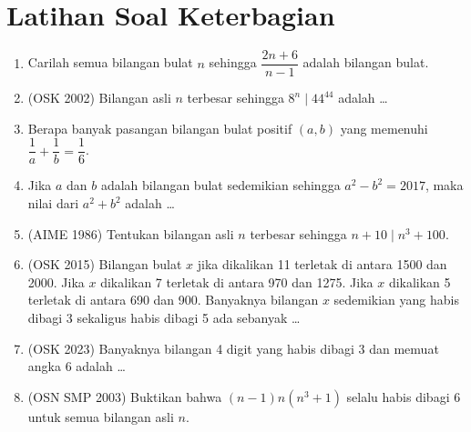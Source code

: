 \documentclass[12pt]{scrartcl}
\begin{document}
\section{Latihan Soal Keterbagian}
\begin{enumerate}    
    \item Carilah semua bilangan bulat $n$ sehingga $\dfrac{2n+6}{n-1}$ adalah bilangan bulat.
    
    \item (OSK 2002) Bilangan asli $n$ terbesar sehingga $8^n \mid 44^{44}$ adalah \dots
    
    \item Berapa banyak pasangan bilangan bulat positif $(a,b)$ yang memenuhi $\dfrac{1}{a}+\dfrac{1}{b}=\dfrac{1}{6}$.
    
    \item Jika $a$ dan $b$ adalah bilangan bulat sedemikian sehingga $a^2-b^2=2017$, maka nilai dari $a^2+b^2$ adalah \dots
    
    \item (AIME 1986) Tentukan bilangan asli $n$ terbesar sehingga $n+10 \mid n^3+100$.

    \item (OSK 2015) Bilangan bulat $x$ jika dikalikan 11 terletak di antara 1500 dan 2000. Jika $x$ dikalikan 7 terletak di antara 970 dan 1275. Jika $x$ dikalikan 5 terletak di antara 690 dan 900. Banyaknya bilangan $x$ sedemikian yang habis dibagi 3 sekaligus habis dibagi 5 ada sebanyak \ldots

    \item (OSK 2023) Banyaknya bilangan 4 digit yang habis dibagi 3 dan memuat angka 6 adalah \ldots
    
    \item (OSN SMP 2003) Buktikan bahwa $(n-1)n(n^3+1)$ selalu habis dibagi 6 untuk semua bilangan asli $n$.
    
\end{enumerate}

    
    
\end{document}
